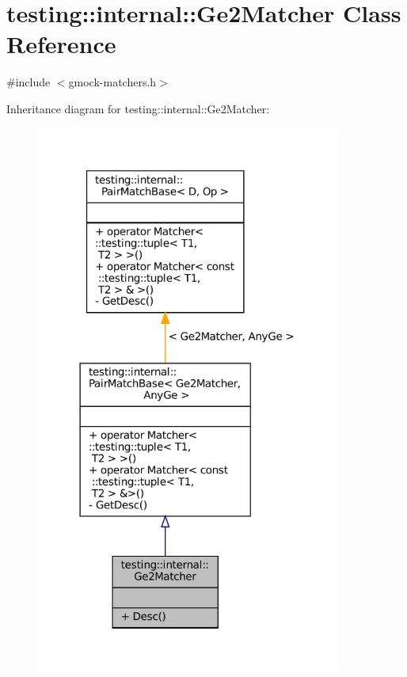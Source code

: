 \hypertarget{classtesting_1_1internal_1_1Ge2Matcher}{}\section{testing\+:\+:internal\+:\+:Ge2\+Matcher Class Reference}
\label{classtesting_1_1internal_1_1Ge2Matcher}


{\ttfamily \#include $<$gmock-\/matchers.\+h$>$}



Inheritance diagram for testing\+:\+:internal\+:\+:Ge2\+Matcher\+:
\nopagebreak
\begin{figure}[H]
\begin{center}
\leavevmode
\includegraphics[width=284pt]{classtesting_1_1internal_1_1Ge2Matcher__inherit__graph}
\end{center}
\end{figure}


